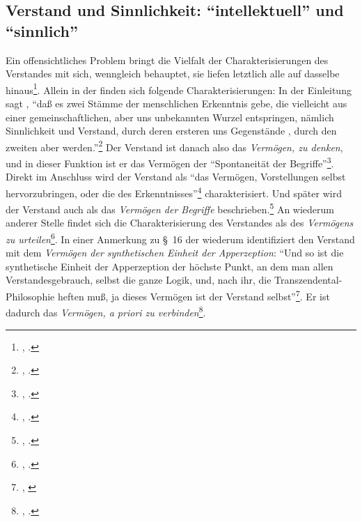 \subsection[Verstand und Sinnlichkeit]{Verstand und Sinnlichkeit:
\enquote{intellektuell} und
\enquote{sinnlich}}\label{subsection:VerstandundRezeptivitaet}
Ein offensichtliches Problem bringt die Vielfalt der Charakterisierungen des
Verstandes mit sich, wenngleich  behauptet, sie liefen
letztlich alle auf dasselbe hinaus\footnote{\cite[Vgl.][A
126]{Kant:KritikderreinenVernunft2003}, \cite[][IV:
92.25--29]{Kant:GesammelteWerke1900ff.}.}. Allein in der  finden sich folgende Charakterisierungen:
In der Einleitung sagt , \enquote{daß es zwei Stämme der
menschlichen Erkenntnis gebe, die vielleicht aus einer gemeinschaftlichen, aber
uns unbekannten Wurzel entspringen, nämlich Sinnlichkeit und Verstand, durch
deren ersteren uns Gegenstände , durch den zweiten aber
 werden.}\footnote{\cite[][B 29]{Kant:KritikderreinenVernunft2003},
\cite[][III: 46.7--11]{Kant:GesammelteWerke1900ff.}.} Der Verstand ist danach also das
\emph{Vermögen, zu denken}, und in dieser Funktion ist er das Vermögen der
\enquote{Spontaneität der Begriffe}\footnote{\cite[][B
74]{Kant:KritikderreinenVernunft2003}, \cite[][III:
74.12]{Kant:GesammelteWerke1900ff.}.}.
Direkt im Anschluss wird der Verstand als \enquote{das Vermögen,
Vorstellungen selbst hervorzubringen, oder die  des
Erkenntnisses}\footnote{\cite[][B 75]{Kant:KritikderreinenVernunft2003},
\cite[][III: 75.7--8]{Kant:GesammelteWerke1900ff.}.} charakterisiert. Und später
wird der Verstand auch als das \emph{Vermögen der Begriffe}
beschrieben.\footnote{\cite[Vgl.][B 199]{Kant:KritikderreinenVernunft2003},
\cite[][III: 146.29--30]{Kant:GesammelteWerke1900ff.}.} An wiederum anderer
Stelle findet sich die Charakterisierung des Verstandes als des \emph{Vermögens
zu urteilen}\footnote{\cite[Vgl.][B 94]{Kant:KritikderreinenVernunft2003},
\cite[][III: 86.12]{Kant:GesammelteWerke1900ff.}.}. In einer
Anmerkung zu \S~16 der  wiederum identifiziert
 den Verstand mit dem \emph{Vermögen der synthetischen
Einheit der Apperzeption}: \enquote{Und so ist die
synthetische Einheit der Apperzeption der höchste Punkt, an dem man allen
Verstandesgebrauch, selbst die ganze Logik, und, nach ihr, die
Transzendental-Philosophie heften muß, ja dieses Vermögen ist der Verstand
selbst}\footnote{\cite[][\S~16]{Kant:KritikderreinenVernunft2003}, \cite[][III:
109.35--38]{Kant:GesammelteWerke1900ff.}}. Er ist dadurch das \emph{Vermögen,
\emph{a priori} zu
verbinden}\footnote{\cite[Vgl.][\S~16]{Kant:KritikderreinenVernunft2003},
\cite[][III: 110.15]{Kant:GesammelteWerke1900ff.}.}.
